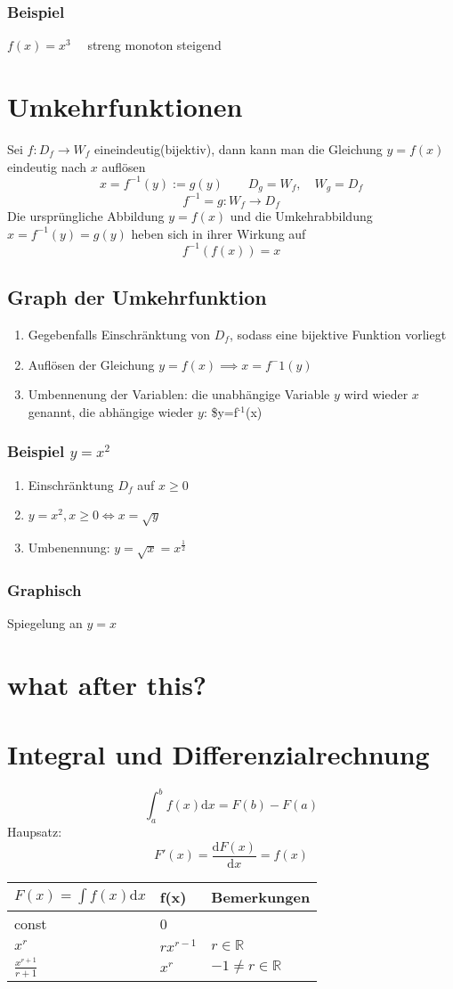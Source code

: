 \documentclass[a4paper]{scrartcl}
\begin{document}
\subsubsection{Beispiel}
\label{sec-8-2-1}
$f(x) = x^3\quad$ streng monoton steigend
\section{Umkehrfunktionen}
\label{sec-9}
Sei $f : D_f\to W_f$ eineindeutig(bijektiv), dann kann man die Gleichung $y=f(x)$ eindeutig nach $x$ auflösen \[x=f^{-1}(y):=g(y)\quad\quad D_g = W_f,\quad W_g = D_f\] \[f^{-1}=g:W_f\to D_f\]
Die ursprüngliche Abbildung $y=f(x)$ und die Umkehrabbildung $x=f^{-1}(y)=g(y)$ heben sich in ihrer Wirkung auf \[f^{-1}(f(x))= x\]
\subsection{Graph der Umkehrfunktion}
\label{sec-9-1}
\begin{enumerate}
\item Gegebenfalls Einschränktung von $D_f$, sodass eine bijektive Funktion vorliegt
\item Auflösen der Gleichung $y=f(x)\implies x=f^-1(y)$
\item Umbennenung der Variablen: die unabhängige Variable $y$ wird wieder $x$ genannt, die abhängige wieder $y$: \$y=f$^{\text{-1}}$(x)
\end{enumerate}
\subsubsection{Beispiel $y=x^2$}
\label{sec-9-1-1}
\begin{enumerate}
\item Einschränktung $D_f$ auf $x\geq 0$
\item $y=x^2, x\geq 0 \iff x = \sqrt{y}$
\item Umbenennung: $y=\sqrt{x} = x^\frac{1}{2}$
\end{enumerate}
\subsubsection{Graphisch}
\label{sec-9-1-2}
Spiegelung an $y=x$
\section{what after this?}
\label{sec-10}
\section{Integral und Differenzialrechnung}
\label{sec-11}
\[\int_a^b f(x)\mathrm{d}x=F(b) - F(a)\]
Haupsatz:
\[F'(x) = \frac{\mathrm{d}F(x)}{\mathrm{d}x} = f(x)\]
\begin{center}
\begin{tabular}{lll}
$F(x)=\int f(x)\mathrm{d}x$ & f(x) & Bemerkungen\\
\hline
const & 0 & \\
$x^r$ & $r x^{r-1}$ & $r\in\mathbb{R}$\\
$\frac{x^{r+1}}{r+1}$ & $x^r$ & $-1 \neq  r\in\mathbb{R}$\\
\end{tabular}
\end{center}
\end{document}
